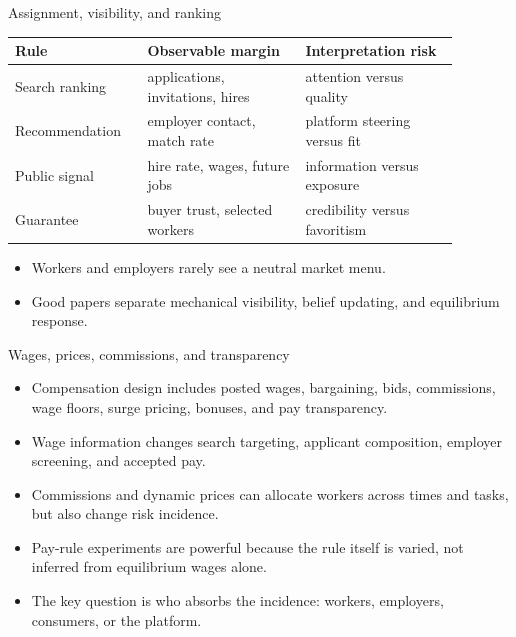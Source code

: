\documentclass[aspectratio=169,11pt]{beamer}
\begin{document}
\begin{frame}{Assignment, visibility, and ranking}
\small
\begin{tabular}{p{0.25\linewidth} p{0.32\linewidth} p{0.31\linewidth}}
\toprule
Rule & Observable margin & Interpretation risk \\
\midrule
Search ranking & applications, invitations, hires & attention versus quality \\
Recommendation & employer contact, match rate & platform steering versus fit \\
Public signal & hire rate, wages, future jobs & information versus exposure \\
Guarantee & buyer trust, selected workers & credibility versus favoritism \\
\bottomrule
\end{tabular}
\vspace{0.25cm}
\begin{itemize}
    \item Workers and employers rarely see a neutral market menu.
    \item Good papers separate mechanical visibility, belief updating, and equilibrium response.
\end{itemize}
\end{frame}

\begin{frame}{Wages, prices, commissions, and transparency}
\begin{itemize}
    \item Compensation design includes posted wages, bargaining, bids, commissions, wage floors, surge pricing, bonuses, and pay transparency.
    \item Wage information changes search targeting, applicant composition, employer screening, and accepted pay.
    \item Commissions and dynamic prices can allocate workers across times and tasks, but also change risk incidence.
    \item Pay-rule experiments are powerful because the rule itself is varied, not inferred from equilibrium wages alone.
    \item The key question is who absorbs the incidence: workers, employers, consumers, or the platform.
\end{itemize}
\end{frame}
\end{document}
